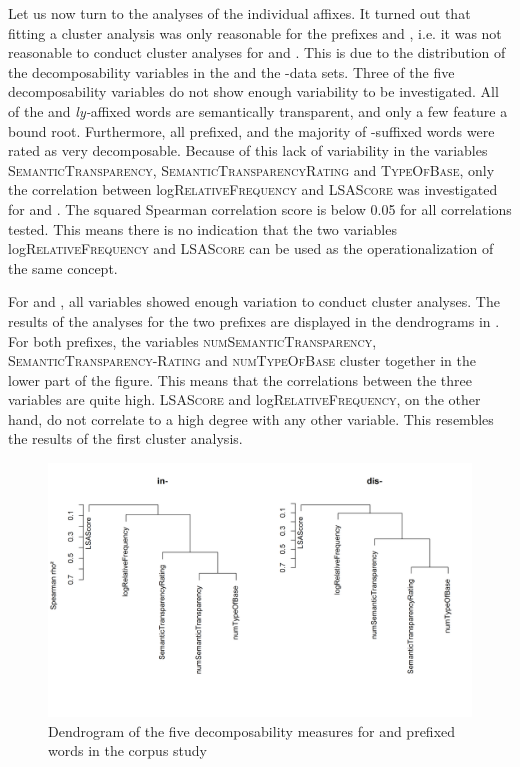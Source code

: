  
 Let us now turn to the analyses of the individual affixes.
 It turned out that fitting a cluster analysis was only reasonable for the prefixes  and , i.e. it was not reasonable to conduct cluster analyses for  and . 
 This is due to the distribution of the decomposability variables in the  and the -data sets. Three of the five decomposability variables do not show enough variability to be investigated. All of the  and \textit{ly-}affixed words are semantically transparent, and only a few feature a bound root. Furthermore, all prefixed, and the majority of -suffixed words were rated as very decomposable. Because of this lack of variability in the variables \textsc{SemanticTransparency}, \textsc{SemanticTransparencyRating} and \textsc{TypeOfBase}, only the correlation between log\textsc{RelativeFrequency} and \textsc{LSAScore} was investigated for  and .
 The squared Spearman correlation score is below 0.05 for all correlations tested. This means there is no indication that the two variables log\textsc{RelativeFrequency} and \textsc{LSAScore} can be used as the operationalization of the same concept.
 
 
 
 
 
 For  and , all variables showed enough variation to conduct cluster analyses. The results of the analyses for the two prefixes are displayed in the dendrograms in . 
 For both prefixes, the variables \textsc{numSemanticTransparency}, \textsc{SemanticTransparency-Rating} and \textsc{numTypeOfBase} cluster together in the lower part of the figure. This means that the correlations between the three variables are quite high. \textsc{LSAScore} and log\textsc{RelativeFrequency}, on the other hand, do not correlate to a high degree with any other variable. This resembles the results of the first cluster analysis.

\begin{figure} []
	\centering
	\includegraphics[scale=0.5]{images/Corpus/clusterAnalysisDecomposabilityCorpusDisAndIn.png}
	\caption{ Dendrogram of the five decomposability measures for  and prefixed words in the corpus study}
	\label{fig:cluster corpus dis and in}
\end{figure}



